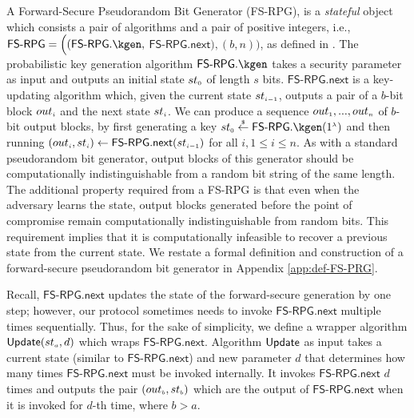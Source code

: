A Forward-Secure Pseudorandom Bit Generator (FS-RPG), is a \emph{stateful} object which consists a pair of algorithms and a pair of positive integers, i.e., $\mathsf{FS\text{-}RPG} = \Big((\mathsf{FS\text{-}RPG}.\kgen, $ $ \mathsf{FS\text{-}RPG.next}),( b, n)\Big)$, as defined in \cite{BellareY03}.  The probabilistic key generation algorithm $\mathsf{FS\text{-}RPG}.\kgen$ takes a security parameter as input and outputs an initial state ${st}_{\scriptscriptstyle 0}$ of length $s$ bits. $\mathsf{FS\text{-}RPG.next}$ is a key-updating algorithm which, given the current state ${st}_{\scriptscriptstyle i-1}$, outputs a pair of a $b$-bit block ${out}_{\scriptscriptstyle i}$ and the next state ${st}_{\scriptscriptstyle i}$. We can produce a sequence  ${out}_{\scriptscriptstyle 1},..., {out}_{\scriptscriptstyle n}$  of  $b$-bit output blocks, by first generating a key  ${st}_{\sss 0}\stackrel{\sss \$}\leftarrow\mathsf{FS\text{-}RPG}.\kgen(1^{\sss \lambda})$ and then running $({out}_{\scriptscriptstyle i}, st_{\scriptscriptstyle i})\leftarrow  \mathsf{FS\text{-}RPG.next} (st_{\scriptscriptstyle i-1})$ for all $i, 1\leq i\leq n$. As with a standard pseudorandom bit generator, output blocks of this generator should be computationally indistinguishable from a random bit
string of the same length. The additional property required from a
FS-RPG is that even when the
adversary learns the state, output blocks generated before the point of
compromise remain computationally indistinguishable from random bits.
This requirement implies that it is computationally infeasible to
recover a previous state from the current state. We restate a formal definition and construction of a forward-secure pseudorandom bit generator in Appendix \ref{app:def-FS-PRG}. 


Recall, $\mathsf{FS\text{-}RPG.next}$ updates the state of the forward-secure generation by one step; however, our protocol sometimes needs to invoke $\mathsf{FS\text{-}RPG.next}$ multiple times sequentially. Thus, for the sake of simplicity, we define a wrapper algorithm $ \mathsf{Update}({st}_{\scriptscriptstyle a}, d)$ which wraps  $\mathsf{FS\text{-}RPG.next}$. Algorithm $\mathsf{Update}$  as input takes a current state (similar to $\mathsf{FS\text{-}RPG.next}$) and new parameter $d$ that determines how many times   $\mathsf{FS\text{-}RPG.next}$ must be invoked internally. It invokes  $\mathsf{FS\text{-}RPG.next}$ $d$ times and outputs the pair  $({out}_{\scriptscriptstyle b}, {st}_{\scriptscriptstyle b})$  which are the output of $\mathsf{FS\text{-}RPG.next}$ when it is invoked for $d$-th time, where $ b> a$. 




